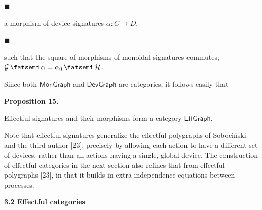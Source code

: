  
 
\par\noindent  $\blacksquare$ 
 
a morphism of device signatures $\alpha:C\to D$,\par
 
 
 
\par\noindent  $\blacksquare$ 
 
such that the square of morphisms of monoidal signatures commutes, $\mathcal{G}\mathop{\fatsemi}\alpha=\alpha_{0}\mathop{\fatsemi}\mathcal{H}$.\par
 
 
  
 
 
 
Since both $\mathsf{MonGraph}$ and $\mathsf{DevGraph}$ are categories, it follows easily that\par
 
 
 
\par\medskip\noindent\textbf{Proposition 15.}\par
 
 
Effectful signatures and their morphisms form a category $\mathsf{EffGraph}$.\par
 
 
 
 
Note that effectful signatures generalize the effectful polygraphs of Sobociński and the third author [23], precisely by allowing each action to have a different set of devices, rather than all actions having a single, global device. The construction of effectful categories in the next section also refines that from effectful polygraphs [23], in that it builds in extra independence equations between processes.\par
 
 
 
 
\par\medskip\noindent\textbf{3.2 Effectful categories}\par
 
